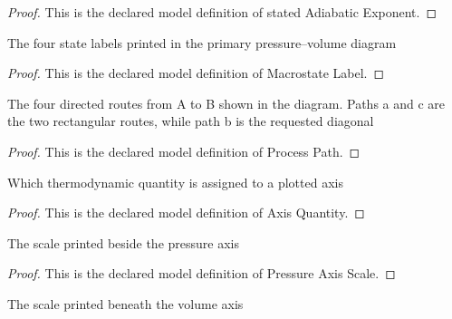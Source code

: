 \begin{proof}
  This is the declared model definition of stated Adiabatic Exponent.
\end{proof}
\begin{definition}
  \label{def:physics:phyx-mini-0356:phyxminiproblems-problemphyxmini0356-macrostatelabel}
  The four state labels printed in the primary pressure--volume diagram
\end{definition}
\begin{proof}
  This is the declared model definition of Macrostate Label.
\end{proof}
\begin{definition}
  \label{def:physics:phyx-mini-0356:phyxminiproblems-problemphyxmini0356-processpath}
  The four directed routes from A to B shown in the diagram. Paths a and c are the two rectangular routes, while path b is the requested diagonal
\end{definition}
\begin{proof}
  This is the declared model definition of Process Path.
\end{proof}
\begin{definition}
  \label{def:physics:phyx-mini-0356:phyxminiproblems-problemphyxmini0356-axisquantity}
  Which thermodynamic quantity is assigned to a plotted axis
\end{definition}
\begin{proof}
  This is the declared model definition of Axis Quantity.
\end{proof}
\begin{definition}
  \label{def:physics:phyx-mini-0356:phyxminiproblems-problemphyxmini0356-pressureaxisscale}
  The scale printed beside the pressure axis
\end{definition}
\begin{proof}
  This is the declared model definition of Pressure Axis Scale.
\end{proof}
\begin{definition}
  \label{def:physics:phyx-mini-0356:phyxminiproblems-problemphyxmini0356-volumeaxisscale}
  The scale printed beneath the volume axis
\end{definition}
